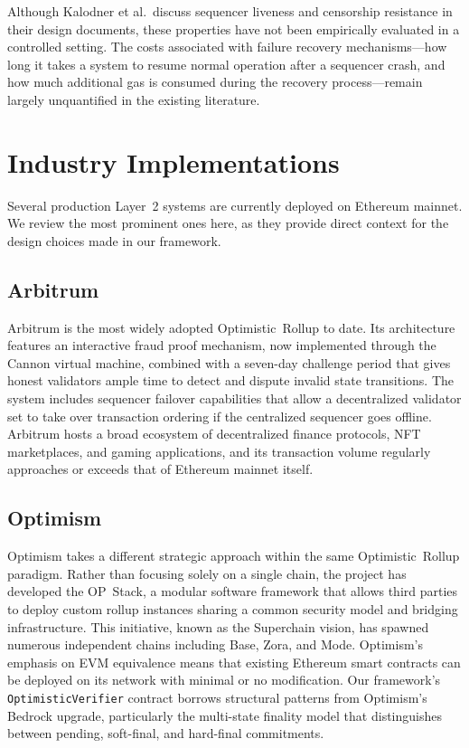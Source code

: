 Although Kalodner et al.\ discuss sequencer liveness and censorship resistance in their design documents, these properties have not been empirically evaluated in a controlled setting. The costs associated with failure recovery mechanisms---how long it takes a system to resume normal operation after a sequencer crash, and how much additional gas is consumed during the recovery process---remain largely unquantified in the existing literature.

\section{Industry Implementations}

Several production Layer~2 systems are currently deployed on Ethereum mainnet. We review the most prominent ones here, as they provide direct context for the design choices made in our framework.

\subsection{Arbitrum}

Arbitrum is the most widely adopted Optimistic~Rollup to date. Its architecture features an interactive fraud proof mechanism, now implemented through the Cannon virtual machine, combined with a seven-day challenge period that gives honest validators ample time to detect and dispute invalid state transitions. The system includes sequencer failover capabilities that allow a decentralized validator set to take over transaction ordering if the centralized sequencer goes offline. Arbitrum hosts a broad ecosystem of decentralized finance protocols, NFT marketplaces, and gaming applications, and its transaction volume regularly approaches or exceeds that of Ethereum mainnet itself.

\subsection{Optimism}

Optimism takes a different strategic approach within the same Optimistic~Rollup paradigm. Rather than focusing solely on a single chain, the project has developed the OP~Stack, a modular software framework that allows third parties to deploy custom rollup instances sharing a common security model and bridging infrastructure. This initiative, known as the Superchain vision, has spawned numerous independent chains including Base, Zora, and Mode. Optimism's emphasis on EVM equivalence means that existing Ethereum smart contracts can be deployed on its network with minimal or no modification. Our framework's \texttt{OptimisticVerifier} contract borrows structural patterns from Optimism's Bedrock upgrade, particularly the multi-state finality model that distinguishes between pending, soft-final, and hard-final commitments.

